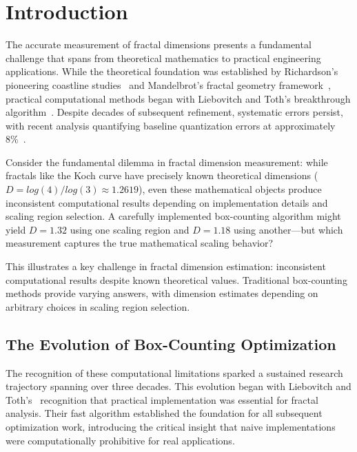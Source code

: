 \documentclass[preprint,12pt]{elsarticle}
\def\log{log}%
\begin{document}

\section{Introduction}
\label{sec:introduction}

The accurate measurement of fractal dimensions presents a fundamental challenge that spans from theoretical mathematics to practical engineering applications. While the theoretical foundation was established by Richardson's pioneering coastline studies~\cite{richardson1961} and Mandelbrot's fractal geometry framework~\cite{mandelbrot1967}, practical computational methods began with Liebovitch and Toth's breakthrough algorithm~\cite{liebovitch1989}. Despite decades of subsequent refinement, systematic errors persist, with recent analysis quantifying baseline quantization errors at approximately 8\%~\cite{bouda2016}.

Consider the fundamental dilemma in fractal dimension measurement: while fractals like the Koch curve have precisely known theoretical dimensions ($D = \log(4)/\log(3) \approx 1.2619$), even these mathematical objects produce inconsistent computational results depending on implementation details and scaling region selection. A carefully implemented box-counting algorithm might yield $D = 1.32$ using one scaling region and $D = 1.18$ using another—but which measurement captures the true mathematical scaling behavior?

This illustrates a key challenge in fractal dimension estimation: inconsistent computational results despite known theoretical values. Traditional box-counting methods provide varying answers, with dimension estimates depending on arbitrary choices in scaling region selection.

\subsection{The Evolution of Box-Counting Optimization}

The recognition of these computational limitations sparked a sustained research trajectory spanning over three decades. This evolution began with Liebovitch and Toth's~\cite{liebovitch1989} recognition that practical implementation was essential for fractal analysis. Their fast algorithm established the foundation for all subsequent optimization work, introducing the critical insight that naive implementations were computationally prohibitive for real applications.
\end{document}
